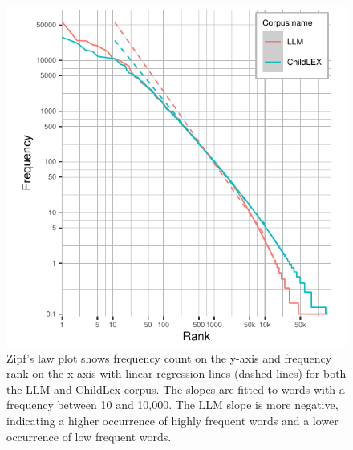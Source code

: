 \documentclass[doc, a4paper]{apa7}
\begin{document}
\begin{figure}[!htbp]
  \centering
    \includegraphics[scale=1.5]{figures/rankplot-normal-3.5-2.pdf}
    \caption{Zipf's law plot shows frequency count on the y-axis and frequency rank on the x-axis with linear regression lines (dashed lines) for both the LLM and ChildLex corpus. The slopes are fitted to words with a frequency between 10 and 10,000. The LLM slope is more negative, indicating a higher occurrence of highly frequent words and a lower occurrence of low frequent words.}
    \label{fig:rankplot-normal}
\end{figure}
\end{document}
